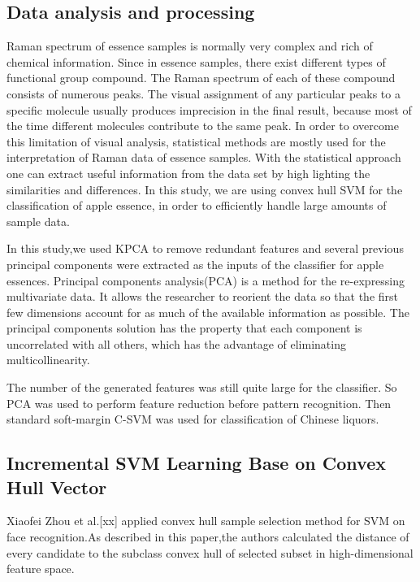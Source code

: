 \documentclass[a4paper]{article}
\begin{document}
\subsection{Data analysis and processing}%
Raman  spectrum  of  essence samples  is  normally  very  complex  and  rich  of  chemical information.  Since  in essence  samples,  there  exist  different  types  of  functional group compound. The Raman spectrum of each of these compound consists of  numerous peaks.  The  visual  assignment  of  any  particular  peaks  to  a  specific  molecule usually  produces  imprecision  in  the  final  result,  because  most  of  the  time  different molecules  contribute  to  the  same  peak.  In  order  to  overcome  this  limitation  of  visual analysis, statistical methods are mostly used for the interpretation of Raman data of essence samples. With the statistical approach one can extract useful information from the data set by high  lighting  the  similarities  and differences.  In  this  study,  we  are using convex hull SVM  for  the  classification of  apple essence,  in order to efficiently handle large amounts of sample data.

In this study,we used KPCA to remove redundant features and several previous principal components were extracted as the inputs of the classifier for apple essences.
Principal components analysis(PCA)  is  a  method  for  the  re-expressing  multivariate  data.   It  allows  the researcher to reorient the data so that the first few dimensions account for as much  of  the  available  information  as  possible.  The  principal  components solution has the property that each component is uncorrelated with all others, which  has  the  advantage  of  eliminating  multicollinearity.

The number of the generated features was still quite large for  the  classifier.  So  PCA  was  used  to  perform  feature reduction  before  pattern  recognition.  Then  standard soft-margin  C-SVM  was  used  for  classification  of  Chinese liquors.

\subsection{Incremental SVM Learning Base on Convex Hull Vector}
Xiaofei Zhou et al.[xx] applied convex hull sample selection method for SVM on face recognition.As described in this paper,the authors calculated the distance of every candidate to the subclass convex hull of selected subset in high-dimensional feature space.
\end{document}
